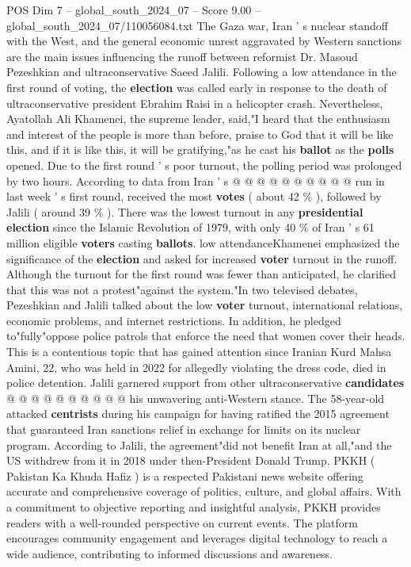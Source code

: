 \begin{textsample}{POS Dim 7 – global\_south\_2024\_07 – Score 9.00 – global\_south\_2024\_07/110056084.txt}
The Gaza war, Iran ' s nuclear standoff with the West, and the general economic unrest aggravated by Western sanctions are the main issues influencing the runoff between reformist Dr.
Masoud Pezeshkian and ultraconservative Saeed Jalili.
Following a low attendance in the first round of voting, the \textbf{election} was called early in response to the death of ultraconservative president Ebrahim Raisi in a helicopter crash.
Nevertheless, Ayatollah Ali Khamenei, the supreme leader, said,"I heard that the enthusiasm and interest of the people is more than before, praise to God that it will be like this, and if it is like this, it will be gratifying,"as he cast his \textbf{ballot} as the \textbf{polls} opened.
Due to the first round ' s poor turnout, the polling period was prolonged by two hours.
According to data from Iran ' s @ @ @ @ @ @ @ @ @ @ run in last week ' s first round, received the most \textbf{votes} ( about 42 \% ), followed by Jalili ( around 39 \% ).
There was the lowest turnout in any \textbf{presidential} \textbf{election} since the Islamic Revolution of 1979, with only 40 \% of Iran ' s 61 million eligible \textbf{voters} casting \textbf{ballots}. low attendanceKhamenei emphasized the significance of the \textbf{election} and asked for increased \textbf{voter} turnout in the runoff.
Although the turnout for the first round was fewer than anticipated, he clarified that this was not a protest"against the system."In two televised debates, Pezeshkian and Jalili talked about the low \textbf{voter} turnout, international relations, economic problems, and internet restrictions.
In addition, he pledged to"fully"oppose police patrols that enforce the need that women cover their heads.
This is a contentious topic that has gained attention since Iranian Kurd Mahsa Amini, 22, who was held in 2022 for allegedly violating the dress code, died in police detention.
Jalili garnered support from other ultraconservative \textbf{candidates} @ @ @ @ @ @ @ @ @ @ his unwavering anti-Western stance.
The 58-year-old attacked \textbf{centrists} during his campaign for having ratified the 2015 agreement that guaranteed Iran sanctions relief in exchange for limits on its nuclear program.
According to Jalili, the agreement"did not benefit Iran at all,"and the US withdrew from it in 2018 under then-President Donald Trump.
PKKH ( Pakistan Ka Khuda Hafiz ) is a respected Pakistani news website offering accurate and comprehensive coverage of politics, culture, and global affairs.
With a commitment to objective reporting and insightful analysis, PKKH provides readers with a well-rounded perspective on current events.
The platform encourages community engagement and leverages digital technology to reach a wide audience, contributing to informed discussions and awareness.

\end{textsample}
